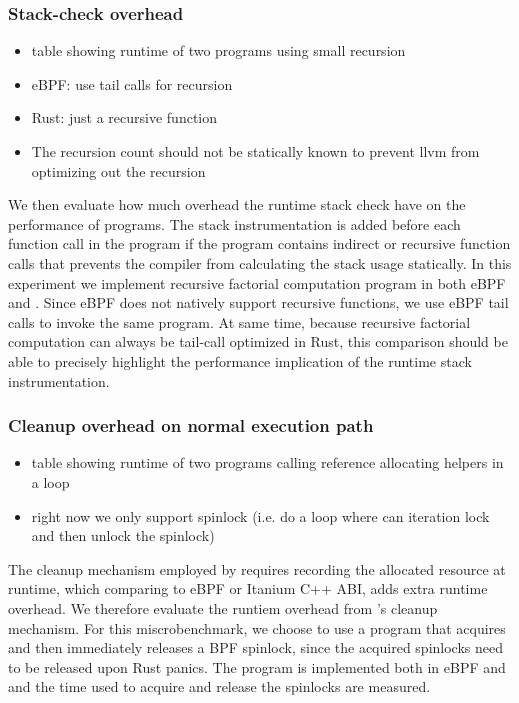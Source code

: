 \subsubsection{Stack-check overhead}
\begin{itemize}
    \item table showing runtime of two programs using small recursion
    \item eBPF: use tail calls for recursion
    \item Rust: just a recursive function
    \item The recursion count should not be statically known to prevent llvm
        from optimizing out the recursion
\end{itemize}

We then evaluate how much overhead the runtime stack check have on the
    performance of \projname{} programs.
The stack instrumentation is added before each
    function call in the \projname{} program if the program contains indirect
    or recursive function calls that prevents the compiler from calculating the
    stack usage statically.
In this experiment we implement recursive factorial computation program in both
    eBPF and \projname{}.
Since eBPF does not natively support recursive functions, we use eBPF tail
    calls to invoke the same program.
At same time, because recursive factorial computation can always be tail-call
    optimized in Rust, this comparison should be able to precisely highlight
    the performance implication of the runtime stack instrumentation.

\subsubsection{Cleanup overhead on normal execution path}
\begin{itemize}
    \item table showing runtime of two programs calling reference allocating
        helpers in a loop
    \item right now we only support spinlock (i.e. do a loop where can
        iteration lock and then unlock the spinlock)
\end{itemize}

The cleanup mechanism employed by \projname{} requires recording the allocated
    resource at runtime, which comparing to eBPF or Itanium C++ ABI, adds extra
    runtime overhead.
We therefore evaluate the runtiem overhead from \projname{}'s cleanup
    mechanism.
For this miscrobenchmark, we choose to use a program that acquires and then
    immediately releases a BPF spinlock, since the acquired spinlocks need to
    be released upon Rust panics.
The program is implemented both in eBPF and \projname{} and the time used to
    acquire and release the spinlocks are measured.


